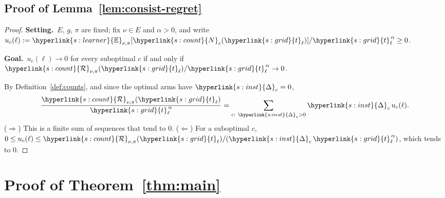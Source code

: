 \documentclass[11pt]{article}
\newcommand{\sy}[2]{{\hyperlink{#1}{#2}}}
\newcommand{\1}{\mathbf{1}}
\newcommand{\Dg}{\sy{s:inst}{\Delta}}
\newcommand{\Enu}{\sy{s:learner}{\mathbb E}}
\newcommand{\Ng}{\sy{s:count}{N}}
\newcommand{\Reg}{\sy{s:count}{\mathcal R}}
\newcommand{\tl}{\sy{s:grid}{t}}
\newcommand{\Setting}{\noindent\textbf{Setting.}\ }
\newcommand{\Goal}{\par\smallskip\noindent\textbf{Goal.}\ }
\begin{document}
\subsection{Proof of Lemma~\ref{lem:consist-regret}}\label{sec:pf-lem:consist-regret}

\begin{proof}
\Setting $E$, $g$, $\pi$ are fixed; fix $\nu\in E$ and $\alpha>0$, and write
$u_c(\ell):=\Enu_{\nu,\pi}[\Ng_c(\tl_\ell)]/\tl_\ell^{\,\alpha}\ge0$.
\Goal $u_c(\ell)\to0$ for every suboptimal $c$ if and only if
$\Reg_{\nu,\pi}(\tl_\ell)/\tl_\ell^{\,\alpha}\to0$.

By Definition~\ref{def:counts}, and since the optimal arms have $\Dg_c=0$,
\begin{equation*}
  \frac{\Reg_{\nu,\pi}(\tl_\ell)}{\tl_\ell^{\,\alpha}}=\sum_{c:\ \Dg_c>0}\Dg_c\,u_c(\ell).
\end{equation*}
($\Rightarrow$) This is a finite sum of sequences that tend to $0$. ($\Leftarrow$) For a suboptimal
$c$, $0\le u_c(\ell)\le\Reg_{\nu,\pi}(\tl_\ell)/(\Dg_c\,\tl_\ell^{\,\alpha})$, which tends to $0$.
\end{proof}

\section{Proof of Theorem~\ref{thm:main}}\label{sec:pf-thm:main}
\end{document}
